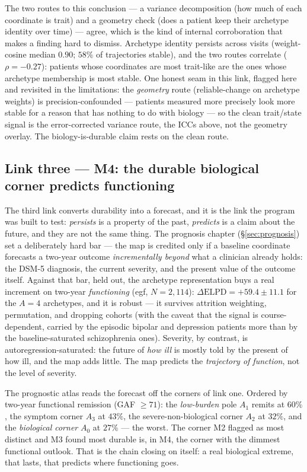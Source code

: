 The two routes to this conclusion --- a variance decomposition (how much of each coordinate is trait) and a
geometry check (does a patient keep their archetype identity over time) --- agree, which is the kind of
internal corroboration that makes a finding hard to dismiss. Archetype identity persists across visits
(weight-cosine median $0.90$; $58\%$ of trajectories stable), and the two routes correlate ($\rho=-0.27$):
patients whose coordinates are most trait-like are the ones whose archetype membership is most stable. One
honest seam in this link, flagged here and revisited in the limitations: the \emph{geometry} route
(reliable-change on archetype weights) is precision-confounded --- patients measured more precisely look
more stable for a reason that has nothing to do with biology --- so the clean trait/state signal is the
error-corrected variance route, the ICCs above, not the geometry overlay. The biology-is-durable claim
rests on the clean route.

\subsection{Link three --- M4: the durable biological corner predicts functioning}
The third link converts durability into a forecast, and it is the link the program was built to test:
\emph{persists} is a property of the past, \emph{predicts} is a claim about the future, and they are not the
same thing. The prognosis chapter (\S\ref{sec:prognosis}) set a deliberately hard bar --- the map is
credited only if a baseline coordinate forecasts a two-year outcome \emph{incrementally beyond} what a
clinician already holds: the DSM-5 diagnosis, the current severity, and the present value of the outcome
itself. Against that bar, held out, the archetype representation buys a real increment on two-year
\emph{functioning} (egf, $N=2{,}114$): $\Delta\text{ELPD}=+59.4\pm11.1$ for the $A=4$ archetypes, and it is
robust --- it survives attrition weighting, permutation, and dropping cohorts (with the caveat that the
signal is course-dependent, carried by the episodic bipolar and depression patients more than by the
baseline-saturated schizophrenia ones). Severity, by contrast, is autoregression-saturated: the future of
\emph{how ill} is mostly told by the present of how ill, and the map adds little. The map predicts the
\emph{trajectory of function}, not the level of severity.

\begin{keyresult}
The prognostic atlas reads the forecast off the corners of link one. Ordered by two-year functional
remission (GAF $\geq 71$): the \emph{low-burden} pole $A_1$ remits at $60\%$, the symptom corner $A_3$ at
$43\%$, the severe-non-biological corner $A_2$ at $32\%$, and the \emph{biological corner} $A_0$ at $27\%$
--- the worst. The corner M2 flagged as most distinct and M3 found most durable is, in M4, the corner with
the dimmest functional outlook. That is the chain closing on itself: a real biological extreme, that lasts,
that predicts where functioning goes.
\end{keyresult}


